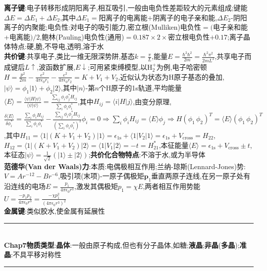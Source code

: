 \documentclass[UTF8,10pt,a4paper]{article}
\begin{document}
\begin{multicols}{2}
\textbf{离子键}:电子转移形成阴阳离子,相互吸引,一般由电负性差距较大的元素组成;键能$\Delta E=\Delta E_1+\Delta E_2$,其中$\Delta E_1=$阳离子的电离能$+$阴离子的电子亲和能,$\Delta E_2$-阴阳离子的内聚能;电负性:对电子的吸引能力,密立根(Mulliken)电负性$=($电子亲和能+电离能$)/2$,鲍林(Pauling)电负性(通用)$=0.187\times 2\times$密立根电负性$+0.17$;离子晶体特点:硬,脆,不导电,透明,溶于水\\
\textbf{共价键}:共享电子,类比一维无限深势阱,基态$k=\frac{\pi}{L}$,能量$E=\frac{\hbar^2\hbar^2}{2m}=\frac{\hbar^2\pi^2}{2mL^2}$,共享电子而成键后$L\uparrow$,波函数扩展,$E\downarrow$;可用紧束缚模型,以H$_2^+$为例,电子哈密顿$H=\frac{p^2}{2m}-\frac{e^2}{4\pi\epsilon_0 r_1}-\frac{e^2}{4\pi\epsilon_0r_2}=K+V_1+V_2$,近似认为状态为H原子基态的叠加,$\lvert\psi\rangle=\phi_1\lvert 1\rangle+\phi_2\lvert 2\rangle$,其中$\lvert n\rangle$-第$n$个H原子的1s轨道,平均能量$\langle E\rangle=\frac{\langle\psi\rvert H\lvert\psi\rangle}{\langle\psi\vert\psi\rangle}=\frac{\sum_{ij}\phi_i\phi_j^*H_{ij}}{\sum_i\phi_i\phi_i^*}$,其中$H_{ij}=\langle i\rvert H\lvert j\rangle$,由变分原理,$\frac{\delta\langle E\rangle}{\delta\phi_i^*}=\frac{\sum_i\phi_iH_{ij}}{\sum_i\phi_i\phi_i^*}-\frac{\sum_{ij}\phi_i\phi_j^*H_{ij}}{(\sum_i\phi_i\phi_i^*)^2}\phi_i=0\Rightarrow\sum_i\phi_iH_{ij}=\langle E\rangle\phi_j\Rightarrow H(\phi_1\,\phi_2)^T=\langle E\rangle(\phi_1\,\phi_2)^T$,其中$H_{11}=\langle 1\rvert(K+V_1+V_2)\lvert 1\rangle=\epsilon_{\text{1s}}+\langle 1\rvert V_2\lvert 1\rangle=\epsilon_{\text{1s}}+V_{\text{cross}}=H_{22}$,$H_{12}=\langle 1\rvert(K+V_1+V_2)\lvert 2\rangle=\langle 1\rvert V_1\lvert 2\rangle=-t=H_{21}^*$,本征能量$\langle E\rangle=\epsilon_{\text{1s}}+V_{\text{cross}}\pm t$,本征态$\lvert\psi\rangle=\frac{1}{\sqrt{2}}(\lvert 1\rangle\pm\lvert 2\rangle)$;\textbf{共价化合物特点}:不溶于水,或为半导体\\
\textbf{范德华(Van der Waals)力}:本质:电偶极相互作用;兰纳-琼斯(Lennard-Jones)势:$V=Ar^{-12}-Br^{-6}$,吸引项(末项)-一原子偶极矩$\bm{p}_1$垂直两原子连线,在另一原子处有沿连线的电场$E=\frac{p_1}{4\pi\epsilon_0r^3}$,激发其偶极矩$p_1=\chi E$,两者相互作用势能$U=\frac{-p_1p_2}{4\pi\epsilon_0r^3}=\frac{-\chi p_1^2}{(4\pi\epsilon_0r^3)^2}$\\
\textbf{金属键}:类似胶水,使金属有延展性\\
\rule{\columnwidth}{.2pt}\\
\textbf{Chap7物质类型}:\textbf{晶体}:一般由原子构成,但也有分子晶体,如糖;\textbf{液晶};\textbf{非晶}(\textbf{多晶});\textbf{准晶}:不具平移对称性\\
\rule{\columnwidth}{.2pt}\\

\end{multicols}
\end{document}
